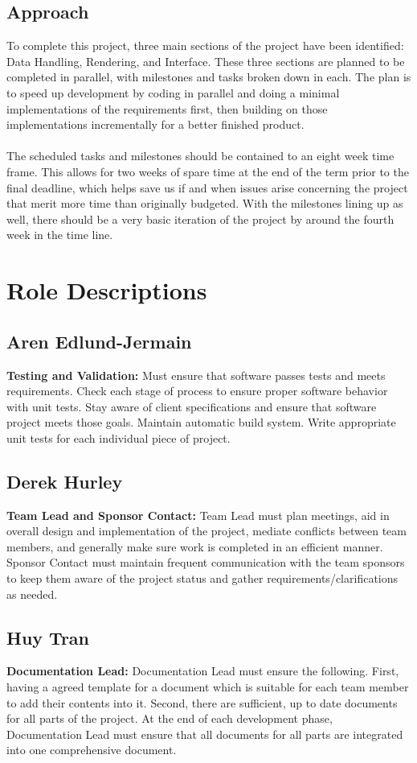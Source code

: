 \documentclass[12pt, letterpaper]{article}
\begin{document}
  \subsection{Approach}
	To complete this project, three main sections of the project have been identified: Data Handling, Rendering, and Interface. These three sections are planned to be completed in parallel, with milestones and tasks broken down in each. The plan is to speed up development by coding in parallel and doing a minimal implementations of the requirements first, then building on those implementations incrementally for a better finished product.
	\\\\
	The scheduled tasks and milestones should be contained to an eight week time frame. This allows for two weeks of spare time at the end of the term prior to the final deadline, which helps save us if and when issues arise concerning the project that merit more time than originally budgeted. With the milestones lining up as well, there should be a very basic iteration of the project by around the fourth week in the time line.

\section{Role Descriptions}
  \subsection{Aren Edlund-Jermain}
  {\bf Testing and Validation:} Must ensure that software passes tests and meets requirements. Check each stage of process to ensure proper software behavior with unit tests. Stay aware of client specifications and ensure that software project meets those goals. Maintain automatic build system. Write appropriate unit tests for each individual piece of project.
  \subsection{Derek Hurley}
  {\bf Team Lead and Sponsor Contact:} Team Lead must plan meetings, aid in overall design and implementation of the project, mediate conflicts between team members, and generally make sure work is completed in an efficient manner. Sponsor Contact must maintain frequent communication with the team sponsors to keep them aware of the project status and gather requirements/clarifications as needed.
  \subsection{Huy Tran}
  {\bf Documentation Lead:} Documentation Lead must ensure the following. First, having a agreed template for a document which is suitable for each team member to add their contents into it. Second, there are sufficient, up to date documents for all parts of the project. At the end of each development phase, Documentation Lead must ensure that all documents for all parts are integrated into one comprehensive document.
\end{document}
